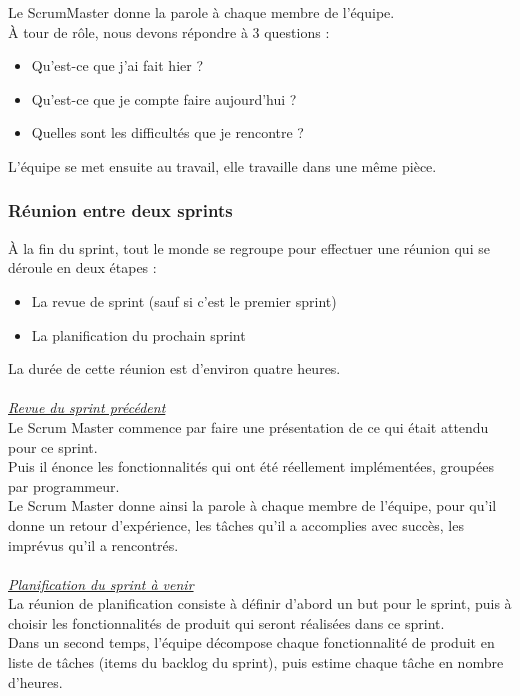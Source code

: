Le ScrumMaster donne la parole à chaque membre de l'équipe.\\
À tour de rôle,  nous devons répondre à 3 questions :
\begin{itemize}
\item Qu'est-ce que j'ai fait hier ?
\item Qu'est-ce que je compte faire aujourd'hui ?
\item Quelles sont les difficultés que je rencontre ?\\
\end{itemize}
L'équipe se met ensuite au travail, elle travaille dans une même pièce.

\subsubsection{Réunion entre deux sprints}
À la fin du sprint, tout le monde se regroupe pour effectuer une réunion qui se
déroule en deux étapes :
\begin{itemize}
\item La revue de sprint (sauf si c'est le premier sprint)
\item La planification du prochain sprint\\
\end{itemize}

La durée de cette réunion est d'environ quatre heures.\\\\
\textit{\underline{Revue du sprint précédent}}\\

Le Scrum Master commence par faire une présentation de ce qui était attendu pour
ce sprint.\\
Puis il énonce les fonctionnalités qui ont été réellement implémentées, groupées
par programmeur.\\
Le Scrum Master donne ainsi la parole à chaque membre de l'équipe, pour qu'il
donne un retour d'expérience, les tâches qu'il a accomplies avec succès, les
imprévus qu'il a rencontrés.\\\\
\textit{\underline{Planification du sprint à venir}}\\

La réunion de planification consiste à définir d'abord
un but pour le sprint, puis à choisir les fonctionnalités de produit qui seront
réalisées dans ce sprint. \\
Dans un second temps, l'équipe décompose chaque fonctionnalité de produit en
liste de tâches (items du backlog du sprint), puis estime chaque tâche en
nombre d'heures. 


